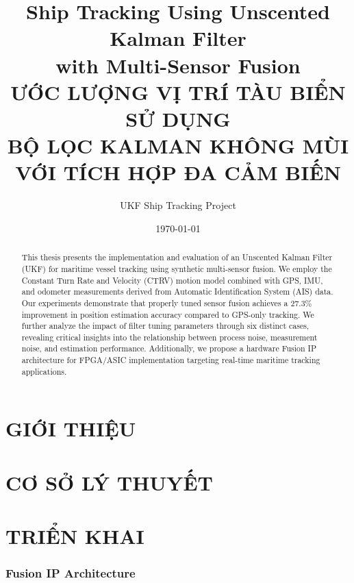 \documentclass[12pt,a4paper]{report}
\title{\textbf{Ship Tracking Using Unscented Kalman Filter\\with Multi-Sensor Fusion}\\[1cm]
\Large ƯỚC LƯỢNG VỊ TRÍ TÀU BIỂN SỬ DỤNG\\BỘ LỌC KALMAN KHÔNG MÙI VỚI TÍCH HỢP ĐA CẢM BIẾN}
\author{UKF Ship Tracking Project}
\date{\today}
\begin{document}
\maketitle

\begin{abstract}
This thesis presents the implementation and evaluation of an Unscented Kalman Filter (UKF) for maritime vessel tracking using synthetic multi-sensor fusion. We employ the Constant Turn Rate and Velocity (CTRV) motion model combined with GPS, IMU, and odometer measurements derived from Automatic Identification System (AIS) data. Our experiments demonstrate that properly tuned sensor fusion achieves a 27.3\% improvement in position estimation accuracy compared to GPS-only tracking. We further analyze the impact of filter tuning parameters through six distinct cases, revealing critical insights into the relationship between process noise, measurement noise, and estimation performance. Additionally, we propose a hardware Fusion IP architecture for FPGA/ASIC implementation targeting real-time maritime tracking applications.
\end{abstract}

\tableofcontents
\newpage

\chapter{GIỚI THIỆU}


\chapter{CƠ SỞ LÝ THUYẾT}


\chapter{TRIỂN KHAI}


\subsection{Fusion IP Architecture}
\end{document}
